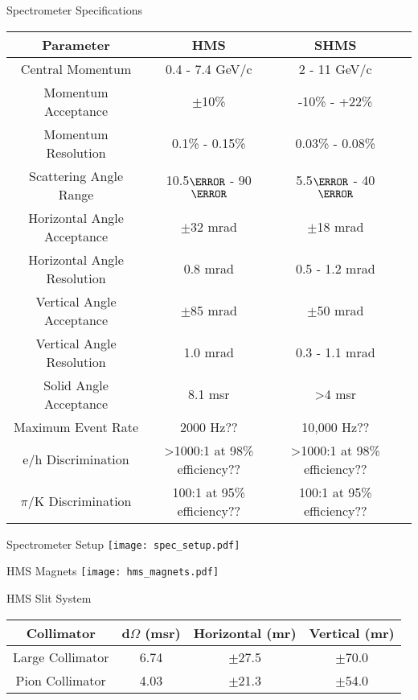 \begin{Mtable}{Spectrometer Specifications}
  \centering
  \begin{tabular}{|c|c|c|c|}
    \hline
    \textbf{Parameter} & \textbf{HMS} & \textbf{SHMS}\\
    \hline
    Central Momentum & 0.4 - 7.4 GeV/c & 2 - 11 GeV/c \\
    Momentum Acceptance & $\pm$10\% & -10\% - +22\% \\
    Momentum Resolution & 0.1\% - 0.15\% & 0.03\% - 0.08\% \\
    Scattering Angle Range & 10.5$\degree$ - 90$\degree$ & 5.5$\degree$ - 40$\degree$ \\
    \hline
    Horizontal Angle Acceptance & $\pm$32 mrad & $\pm$18 mrad \\
    Horizontal Angle Resolution & 0.8 mrad & 0.5 - 1.2 mrad \\
    Vertical Angle Acceptance & $\pm$85 mrad & $\pm$50 mrad \\
    Vertical Angle Resolution & 1.0 mrad & 0.3 - 1.1 mrad \\
    Solid Angle Acceptance & 8.1 msr & >4 msr \\
    \hline
    Maximum Event Rate & 2000 Hz?? & 10,000 Hz?? \\
    e/h Discrimination & >1000:1 at 98\% efficiency?? & >1000:1 at 98\% efficiency?? \\
    $\pi$/K Discrimination & 100:1 at 95\% efficiency?? & 100:1 at 95\% efficiency?? \\
    \hline
  \end{tabular}
  \caption{Break down of the HMS and SHMS specifications and capablilities..}  
  \label{tab:2-4_spectrometer}
\end{Mtable}

\begin{Mfigure}{Spectrometer Setup}
  \centering
  \texttt{[image: spec\_setup.pdf]}
  \caption{Overview of Hall C Spectrometer setup.}
  \label{fig:2-4_spec_setup}
\end{Mfigure}

\begin{Mfigure}{HMS Magnets}
  \centering
  \texttt{[image: hms\_magnets.pdf]}
  \caption{Overview of HMS optical setup.}
  \label{fig:2-4_hms_magnets}
\end{Mfigure}

\begin{Mtable}{HMS Slit System}
  \centering
  \begin{tabular}{|c|c|c|c|}
    \hline
    \textbf{Collimator} & \textbf{d$\Omega$ (msr)} & \textbf{Horizontal (mr)} & \textbf{Vertical (mr)} \\
    \hline
    Large Collimator & 6.74 & $\pm$27.5 & $\pm$70.0 \\
    Pion Collimator & 4.03 & $\pm$21.3 & $\pm$54.0 \\
    \hline
  \end{tabular}
  \caption{Breakdown of HMS slit system's apertures.}
  \label{tab:2-4_hms_slit}
\end{Mtable}

